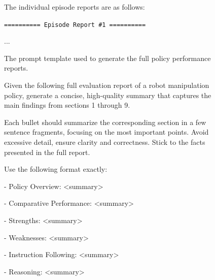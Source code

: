 \begin{figure}[ht!]
{\begin{minipage}{\linewidth}
\vspace{1em}
The individual episode reports are as follows:\par
\vspace{1em}
\texttt{========== Episode Report \#1 ==========}\par
...
\end{minipage}}
\caption{The prompt template used to generate the full policy performance reports.}
\label{figure:full_policy_performance_analysis_prompt}
\end{figure}


\begin{figure}[ht!]
\colorbox{gray!10}{
\begin{minipage}{\linewidth}
\fontsize{8pt}{9pt}\selectfont
Given the following full evaluation report of a robot manipulation policy, generate a concise, high-quality summary that captures the main findings from sections 1 through 9.\par

\vspace{1em}
Each bullet should summarize the corresponding section in a few sentence fragments, focusing on the most important points. Avoid excessive detail, ensure clarity and correctness. Stick to the facts presented in the full report.\par

\vspace{1em}
Use the following format exactly:\par

\vspace{1em}
- Policy Overview: \textless{}summary\textgreater{}\par

\vspace{1em}
- Comparative Performance: \textless{}summary\textgreater{}\par

\vspace{1em}
- Strengths: \textless{}summary\textgreater{}\par

\vspace{1em}
- Weaknesses: \textless{}summary\textgreater{}\par

\vspace{1em}
- Instruction Following: \textless{}summary\textgreater{}\par

\vspace{1em}
- Reasoning: \textless{}summary\textgreater{}\par


\end{minipage}}
\end{figure}
